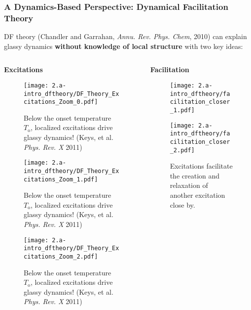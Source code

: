 \begin{frame}[t]\label{a.2}
\frametitle{A Dynamics-Based Perspective: Dynamical Facilitation Theory}

DF theory (Chandler and Garrahan, \textit{Annu. Rev. Phys. Chem}, 2010) can explain glassy dynamics \textbf{without knowledge of local structure} with two key ideas:



\begin{columns}[T]
\begin{column}[T]{0.5\textwidth}

\centering\textbf{\Large Excitations}

\begin{figure}[t]
\begin{overprint}

\centering\texttt{[image: 2.a-intro\_dftheory/DF\_Theory\_Excitations\_Zoom\_0.pdf]}\caption{Below the onset temperature $T_\mathrm{o}$, localized excitations drive glassy dynamics! (Keys, et al. \textit{Phys. Rev. X} 2011)}

\centering\texttt{[image: 2.a-intro\_dftheory/DF\_Theory\_Excitations\_Zoom\_1.pdf]}\caption{Below the onset temperature $T_\mathrm{o}$, localized excitations drive glassy dynamics! (Keys, et al. \textit{Phys. Rev. X} 2011)}

\centering\texttt{[image: 2.a-intro\_dftheory/DF\_Theory\_Excitations\_Zoom\_2.pdf]}\caption{Below the onset temperature $T_\mathrm{o}$, localized excitations drive glassy dynamics! (Keys, et al. \textit{Phys. Rev. X} 2011)}


\end{overprint}
\end{figure}

\end{column}
\begin{column}[T]{0.50\textwidth}

\centering\textbf{\Large Facilitation}
\begin{figure}[t]
\begin{center}
\begin{overprint}
\centerline{\texttt{[image: 2.a-intro\_dftheory/facilitation\_closer\_1.pdf]}}
\centerline{\texttt{[image: 2.a-intro\_dftheory/facilitation\_closer\_2.pdf]}}
\end{overprint}
\end{center}
\caption{Excitations facilitate the creation and relaxation of another excitation close by.}
\end{figure}


\end{column}
\end{columns}
\end{frame}
